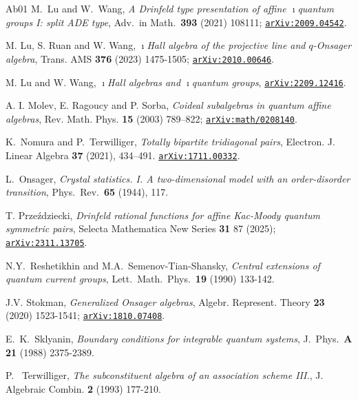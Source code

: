 \documentclass[11pt]{amsart}
\numberwithin{equation}{section}
\numberwithin{equation}{section}
\begin{document}
\begin{thebibliography}{Ab01}
M.\ Lu and W.\ Wang, \textit{A Drinfeld type presentation of affine $\imath$quantum groups I: split ADE type},  Adv.\ in Math.\ {\bf 393} (2021) 108111; \href{https://arxiv.org/abs/2009.04542}{\tt arXiv:2009.04542}.

M. Lu, S. Ruan and W. Wang, {\it $\imath$Hall algebra of the projective line and $q$-Onsager algebra}, Trans. AMS {\bf 376} (2023) 1475-1505; 
\href{https://arxiv.org/abs/2010.00646}{\tt arXiv:2010.00646}.

M. Lu and W. Wang, {\it $\imath$Hall algebras and  $\imath$quantum groups}, 
\href{https://arxiv.org/abs/2209.12416}{\tt arXiv:2209.12416}.



A. I. Molev, E. Ragoucy and P. Sorba, {\it Coideal subalgebras in quantum affine algebras}, Rev.
Math. Phys. {\bf 15} (2003) 789–822; \href{https://arxiv.org/abs/math/0208140}{\tt arXiv:math/0208140}.


K.\ Nomura and P.\ Terwilliger,  \textit{Totally bipartite tridiagonal pairs}, Electron. J. Linear Algebra {\bf 37} (2021), 434–491. \href{https://arxiv.org/abs/1711.00332}
{\tt arXiv:1711.00332}.

L.\ Onsager, \textit{Crystal statistics. I. A two-dimensional model with an order-disorder transition},  Phys.\ Rev.\  {\bf65} (1944), 117.


T. Prze{\'z}dziecki, {\it Drinfeld rational functions for affine Kac-Moody quantum symmetric pairs}, Selecta Mathematica New Series {\bf 31} 87 (2025); \href{https://arxiv.org/abs/2311.13705}{\tt arXiv:2311.13705}.


 N.Y.\ Reshetikhin and M.A.\ Semenov-Tian-Shansky, \textit{Central extensions of quantum current groups}, Lett.\ Math.\ Phys.\ {\bf 19} (1990) 133-142.
	 
J.V. Stokman, {\it Generalized Onsager algebras}, Algebr. Represent. Theory {\bf 23} (2020) 1523-1541; \href{https://arxiv.org/abs/1810.07408}{\tt arXiv:1810.07408}.
	 

E.\ K.\ Sklyanin, {\it Boundary conditions for integrable quantum systems}, J.\ Phys.\ {\bf A 21} (1988) 2375-2389.

P. \ Terwilliger, {\it  The subconstituent algebra of an association scheme III.}, J. Algebraic
Combin. {\bf 2} (1993) 177-210.


\end{thebibliography}
\end{document}
